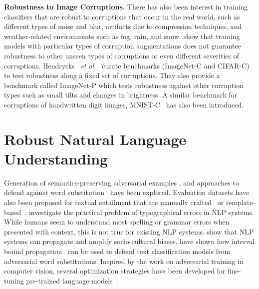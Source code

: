 \textbf{Robustness to Image Corruptions.}
There has also been interest in training classifiers that are robust to corruptions that occur in the real world, such as different types of noise and blur, artifacts due to compression techniques, and weather-related environments such as fog, rain, and snow.
\citep{vasiljevic2016examining,geirhos2018generalisation} show that training models with particular types of corruption augmentations does not guarantee robustness to other unseen types of corruptions or even different severities of corruptions. 
Hendrycks~ \textit{et al.}~\citep{hendrycks2018benchmarking} curate benchmarks (ImageNet-C and CIFAR-C) to test robustness along a fixed set of corruptions.
They also provide a benchmark called ImageNet-P which tests robustness against other corruption types such as small tilts and changes in brightness.
A similar benchmark for corruptions of handwritten digit images, MNIST-C~\citep{mu2019mnist} has also been introduced.





\section{Robust Natural Language Understanding}
Generation of semantics-preserving adversarial examples 
\citep{jia2017adversarial,ribeiro2018semantically,iyyer2018adversarial,alzantot2018generating}, and approaches to defend against word substitution~\citep{jia2019certified} have been explored.
Evaluation datasets have also been proposed for textual entailment that are manually crafted~\citep{gardner2020evaluating} or template-based~\citep{mccoy2019right,glockner2018breaking,naik2018stress}.
\citet{belinkov2018synthetic,ebrahimi2018hotflip,jones2020robust} investigate the practical problem of typographical errors in NLP systems.
While humans seem to understand most spelling or grammar errors when presented with context, this is not true for existing NLP systems.
\citet{zhao2017men,hendricks2018women,rudinger2018gender} show that NLP systems can propagate and amplify socio-cultural biases.
\citet{jia-etal-2019-certified} have shown how interval bound propagation~\citep{dvijotham2018dual} can be used to defend text classification models from adversarial word substitutions.
Inspired by the work on adversarial training in computer vision, several optimization strategies have been developed for fine-tuning pre-trained language models~\citep{miyato2016adversarial,oren2019distributionally,jiang2020smart,zhu2020freelb}.

